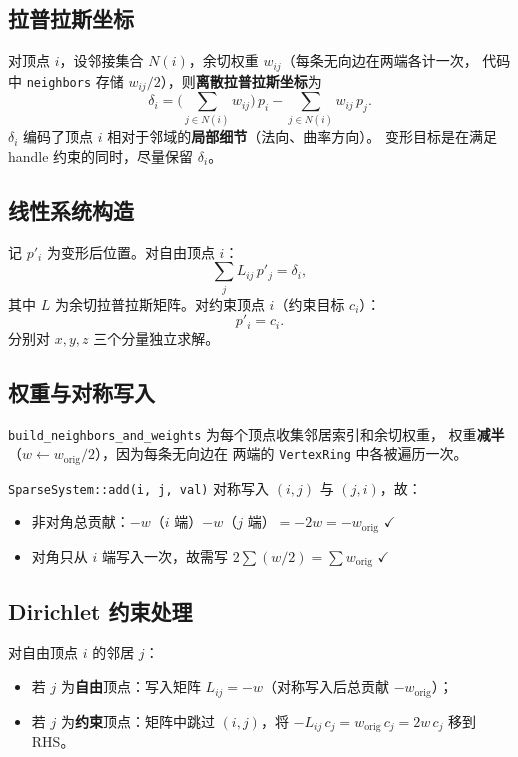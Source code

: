 \documentclass[11pt,a4paper]{article}
\begin{document}
\subsection{拉普拉斯坐标}

对顶点 $i$，设邻接集合 $N(i)$，余切权重 $w_{ij}$（每条无向边在两端各计一次，
代码中 \texttt{neighbors} 存储 $w_{ij}/2$），则\textbf{离散拉普拉斯坐标}为
\[
  \delta_i = \bigl(\sum_{j \in N(i)} w_{ij}\bigr)\, p_i - \sum_{j \in N(i)} w_{ij}\, p_j.
\]
$\delta_i$ 编码了顶点 $i$ 相对于邻域的\textbf{局部细节}（法向、曲率方向）。
变形目标是在满足 handle 约束的同时，尽量保留 $\delta_i$。

\subsection{线性系统构造}

记 $p'_i$ 为变形后位置。对自由顶点 $i$：
\[
  \sum_j L_{ij}\, p'_j = \delta_i,
\]
其中 $L$ 为余切拉普拉斯矩阵。对约束顶点 $i$（约束目标 $c_i$）：
\[
  p'_i = c_i.
\]
分别对 $x, y, z$ 三个分量独立求解。

\subsection{权重与对称写入}

\texttt{build\_neighbors\_and\_weights} 为每个顶点收集邻居索引和余切权重，
权重\textbf{减半}（$w \leftarrow w_{\text{orig}}/2$），因为每条无向边在
两端的 \texttt{VertexRing} 中各被遍历一次。

\texttt{SparseSystem::add(i, j, val)} 对称写入 $(i,j)$ 与 $(j,i)$，故：

\begin{itemize}
  \item 非对角总贡献：$-w$（$i$ 端）$-w$（$j$ 端）$= -2w = -w_{\text{orig}}$ $\checkmark$
  \item 对角只从 $i$ 端写入一次，故需写 $2 \sum (w/2) = \sum w_{\text{orig}}$ $\checkmark$
\end{itemize}

\subsection{Dirichlet 约束处理}

对自由顶点 $i$ 的邻居 $j$：
\begin{itemize}
  \item 若 $j$ 为\textbf{自由}顶点：写入矩阵 $L_{ij} = -w$（对称写入后总贡献 $-w_{\text{orig}}$）；
  \item 若 $j$ 为\textbf{约束}顶点：矩阵中跳过 $(i, j)$，将 $-L_{ij}\, c_j = w_{\text{orig}}\, c_j = 2w\, c_j$ 移到 RHS。
\end{itemize}
\end{document}
